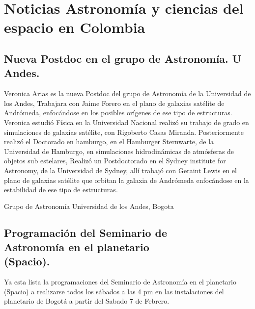 \documentclass{book}
\begin{document}
\tableofcontents{}



\newpage


\renewcommand\thesection{\arabic{section}}
\renewcommand\thesubsection{\arabic{subsection}}

\section*{Noticias Astronomía y ciencias del espacio en Colombia}

\subsection{Nueva Postdoc en el grupo de Astronomía. U Andes.}

Veronica Arias es la nueva Postdoc del grupo de Astronomía de la Universidad de los Andes, Trabajara con Jaime Forero en el plano de galaxias satélite de Andrómeda, enfocándose en los posibles orígenes de ese tipo de estructuras. Veronica estudió Física en la Universidad Nacional realizó su trabajo de grado en simulaciones de galaxias satélite, con Rigoberto Casas Miranda. Posteriormente realizó el Doctorado en hamburgo, en el Hamburger Sternwarte, de la Universidad de Hamburgo, en simulaciones hidrodinámicas de atmósferas de objetos sub estelares, Realizó un Postdoctorado en el Sydney institute for Astronomy, de la Universidad de Sydney, allí trabajó con Geraint Lewis en el plano de galaxias satélite que orbitan la galaxia de Andrómeda enfocándose en la estabilidad de ese tipo de estructuras.\\

\begin{flushright}
Grupo de Astronomía Universidad de los Andes, Bogota
\end{flushright}

\subsection{Programación del Seminario de\\ Astronomía en el planetario\\ (Spacio).}

Ya esta lista la programaciones del Seminario de Astronomía en el planetario (Spacio) a realizarse todos los sábados a las 4 pm en las instalaciones del planetario de Bogotá a partir del Sabado 7 de Febrero.\\
\end{document}
